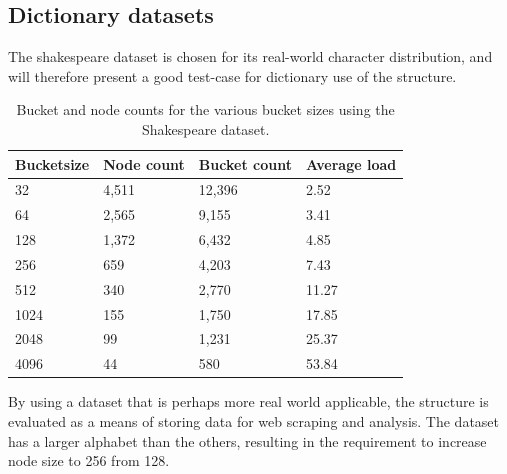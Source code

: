 \subsection{Dictionary datasets}
The shakespeare dataset is chosen for its real-world character distribution, and will
therefore present a good test-case for dictionary use of the structure.

\begin{table}[h]
    \centering
    \begin{tabular}[here]{ l l l l }
        \hline
        Bucketsize&  Node count & Bucket count& Average load  \\\hline
        32        &  4,511      & 12,396      & 2.52 \\
        64        &  2,565      & 9,155       & 3.41 \\
        128       &  1,372      & 6,432       & 4.85 \\
        256       &  659        & 4,203       & 7.43 \\
        512       &  340        & 2,770       & 11.27\\
        1024      &  155        & 1,750       & 17.85\\ 
        2048      &  99         & 1,231       & 25.37\\ 
        4096      &  44         & 580         & 53.84\\\hline 
    \end{tabular}
    \caption{Bucket and node counts for the various bucket sizes using the Shakespeare
        dataset.}
    \label{tab:bncounts_shakespeare}
\end{table}


By using a dataset that is perhaps more real world applicable, the structure is
evaluated as a means of storing data for web scraping and analysis. The dataset has a 
larger alphabet than the others, resulting in the requirement to increase
node size to 256 from 128.


